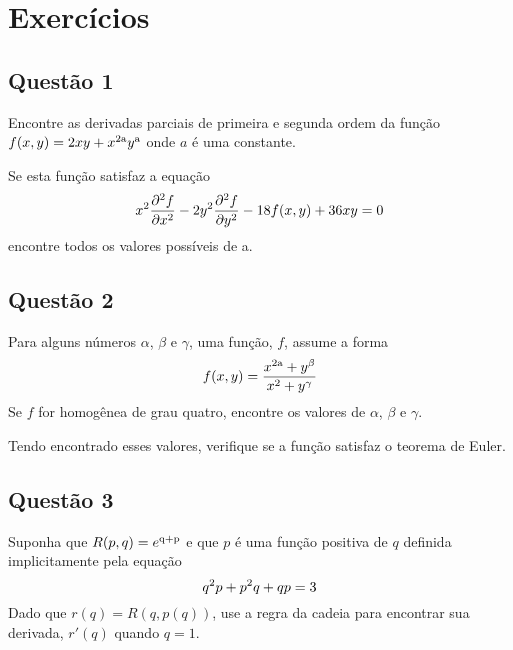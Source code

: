 \documentclass[a4paper]{article}
\begin{document}
\section*{Exercícios}
\subsection*{Questão 1}
Encontre as derivadas parciais de primeira e segunda ordem da função
$f(x, y) = 2xy + x\textsuperscript{2a}y\textsuperscript{a}$ 
onde $a$ é uma constante.
\par Se esta função satisfaz a equação
\begin{equation}
    x\textsuperscript{2}\frac{\partial\textsuperscript{2}f}{\partial x\textsuperscript{2}} - 2y\textsuperscript{2}\frac{\partial\textsuperscript{2}f}{\partial y\textsuperscript{2}} -18f(x,y) + 36xy = 0
\end{equation}
encontre todos os valores possíveis de a.
\subsection*{Questão 2}
Para alguns números $\alpha$, $\beta$ e $\gamma$, uma função, $f$, assume a forma
\begin{equation}
    f(x,y) = \frac{x\textsuperscript{2a} + y\textsuperscript{$\beta$}}{x\textsuperscript{2} + y\textsuperscript{$\gamma$}}
\end{equation}
Se $f$ for homogênea de grau quatro, encontre os valores de $\alpha$, $\beta$ e $\gamma$.
\par Tendo encontrado esses valores, verifique se a função satisfaz o teorema de Euler.
\subsection*{Questão 3}
Suponha que $R(p, q) = e\textsuperscript{q+p}$ e que $p$ é uma função positiva de $q$ definida
implicitamente pela equação
\begin{equation}
    q\textsuperscript{2}p + p\textsuperscript{2}q + qp = 3
\end{equation}
Dado que $r(q) = R(q, p(q))$, use a regra da cadeia para encontrar sua derivada, $r'(q)$ quando $q = 1$.
\end{document}
